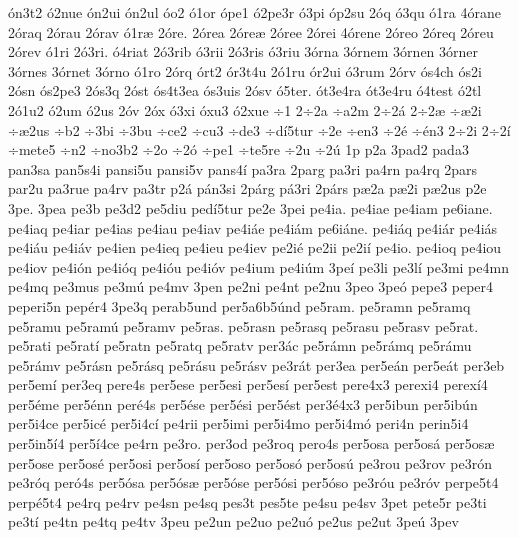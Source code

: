 {^^f3n3t2
^^f32nue
^^f3n2ui
^^f3n2ul
^^f3o2
^^f31or
^^f3pe1
^^f32pe3r
^^f33pi
^^f3p2su
2^^f3q
^^f33qu
^^f31ra
4^^f3rane
2^^f3raq
2^^f3rau
2^^f3rav
^^f31r^^e6
2^^f3re.
2^^f3rea
2^^f3re^^e6
2^^f3ree
2^^f3rei
4^^f3rene
2^^f3reo
2^^f3req
2^^f3reu
2^^f3rev
^^f31ri
2^^f33ri.
^^f34riat
2^^f33rib
^^f33rii
2^^f33ris
^^f33riu
3^^f3rna
3^^f3rnem
3^^f3rnen
3^^f3rner
3^^f3rnes
3^^f3rnet
3^^f3rno
^^f31ro
2^^f3rq
^^f3rt2
^^f3r3t4u
2^^f31ru
^^f3r2ui
^^f33rum
2^^f3rv
^^f3s4ch
^^f3s2i
2^^f3sn
^^f3s2pe3
2^^f3s3q
2^^f3st
^^f3s4t3ea
^^f3s3uis
2^^f3sv
^^f35ter.
^^f3t3e4ra
^^f3t3e4ru
^^f34test
^^f32tl
2^^f31u2
^^f32um
^^f32us
2^^f3v
2^^f3x
^^f33xi
^^f3xu3
^^f32xue
^^f71
2^^f72a
^^f7a2m
2^^f72^^e1
2^^f72^^e6
^^f7^^e62i
^^f7^^e62us
^^f7b2
^^f73bi
^^f73bu
^^f7ce2
^^f7cu3
^^f7de3
^^f7d^^ed5tur
^^f72e
^^f7en3
^^f72^^e9
^^f7^^e9n3
2^^f72i
2^^f72^^ed
^^f7mete5
^^f7n2
^^f7no3b2
^^f72o
^^f72^^f3
^^f7pe1
^^f7te5re
^^f72u
^^f72^^fa
1p
p2a
3pad2
pada3
pan3sa
pan5s4i
pansi5u
pansi5v
pans4^^ed
pa3ra
2parg
pa3ri
pa4rn
pa4rq
2pars
par2u
pa3rue
pa4rv
pa3tr
p2^^e1
p^^e1n3si
2p^^e1rg
p^^e13ri
2p^^e1rs
p^^e62a
p^^e62i
p^^e62us
p2e
3pe.
3pea
pe3b
pe3d2
pe5diu
ped^^ed5tur
pe2e
3pei
pe4ia.
pe4iae
pe4iam
pe6iane.
pe4iaq
pe4iar
pe4ias
pe4iau
pe4iav
pe4i^^e1e
pe4i^^e1m
pe6i^^e1ne.
pe4i^^e1q
pe4i^^e1r
pe4i^^e1s
pe4i^^e1u
pe4i^^e1v
pe4ien
pe4ieq
pe4ieu
pe4iev
pe2i^^e9
pe2ii
pe2i^^ed
pe4io.
pe4ioq
pe4iou
pe4iov
pe4i^^f3n
pe4i^^f3q
pe4i^^f3u
pe4i^^f3v
pe4ium
pe4i^^fam
3pe^^ed
pe3li
pe3l^^ed
pe3mi
pe4mn
pe4mq
pe3mus
pe3m^^fa
pe4mv
3pen
pe2ni
pe4nt
pe2nu
3peo
3pe^^f3
pepe3
peper4
peperi5n
pep^^e9r4
3pe3q
perab5und
per5a6b5^^fand
pe5ram.
pe5ramn
pe5ramq
pe5ramu
pe5ram^^fa
pe5ramv
pe5ras.
pe5rasn
pe5rasq
pe5rasu
pe5rasv
pe5rat.
pe5rati
pe5rat^^ed
pe5ratn
pe5ratq
pe5ratv
per3^^e1c
pe5r^^e1mn
pe5r^^e1mq
pe5r^^e1mu
pe5r^^e1mv
pe5r^^e1sn
pe5r^^e1sq
pe5r^^e1su
pe5r^^e1sv
pe3r^^e1t
per3ea
per5e^^e1n
per5e^^e1t
per3eb
per5em^^ed
per3eq
pere4s
per5ese
per5esi
per5es^^ed
per5est
pere4x3
perexi4
perex^^ed4
per5^^e9me
per5^^e9nn
per^^e94s
per5^^e9se
per5^^e9si
per5^^e9st
per3^^e94x3
per5ibun
per5ib^^fan
per5i4ce
per5ic^^e9
per5i4c^^ed
pe4rii
per5imi
per5i4mo
per5i4m^^f3
peri4n
perin5i4
per5in5^^ed4
per5^^ed4ce
pe4rn
pe3ro.
per3od
pe3roq
pero4s
per5osa
per5os^^e1
per5os^^e6
per5ose
per5os^^e9
per5osi
per5os^^ed
per5oso
per5os^^f3
per5os^^fa
pe3rou
pe3rov
pe3r^^f3n
pe3r^^f3q
per^^f34s
per5^^f3sa
per5^^f3s^^e6
per5^^f3se
per5^^f3si
per5^^f3so
pe3r^^f3u
pe3r^^f3v
perpe5t4
perp^^e95t4
pe4rq
pe4rv
pe4sn
pe4sq
pes3t
pes5te
pe4su
pe4sv
3pet
pete5r
pe3ti
pe3t^^ed
pe4tn
pe4tq
pe4tv
3peu
pe2un
pe2uo
pe2u^^f3
pe2us
pe2ut
3pe^^fa
3pev
}
